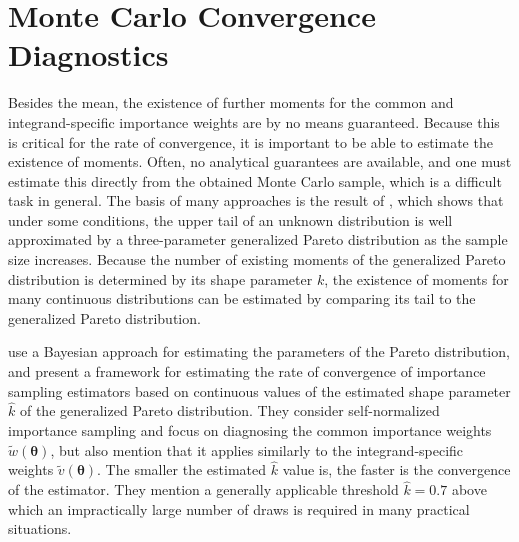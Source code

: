 \documentclass[12pt]{article}
\newcommand{\ome}{v}
\begin{document}
%
%
\section{Monte Carlo Convergence Diagnostics} \label{sec:diagnost}




Besides the mean, the existence of further moments for the
common and integrand-specific importance weights are
by no means guaranteed.
Because this is critical for the rate of convergence, it
is important to be able to estimate the existence of moments. Often, no analytical
guarantees are available, and one must estimate this directly from the obtained Monte Carlo sample, which is a difficult task in general.
The basis of many approaches is the result of
\citet{pickands1975statistical}, which shows that under some conditions, the upper tail of an unknown
distribution is well approximated by a three-parameter generalized Pareto distribution
as the sample size increases.
Because the number of existing moments
of the generalized Pareto distribution is determined by its shape parameter $k$, the existence of moments for many continuous distributions can be estimated by comparing its tail to the generalized Pareto distribution.
%
%
%
%




%
%
%
\citet{vehtari2015pareto} use a Bayesian approach
for estimating the parameters of the Pareto distribution, and
present a framework for estimating the rate of convergence of importance sampling estimators
based on continuous values of
the estimated shape parameter $\hat{k}$ of the generalized Pareto distribution.
%
%
%
%
They consider self-normalized importance sampling and focus on
diagnosing the common importance weights
$\widetilde{w} (\boldsymbol{\theta})$, but also mention that
it applies similarly to the integrand-specific weights
$\widetilde{\ome} (\boldsymbol{\theta})$.
The smaller the estimated $\hat{k}$ value is, the faster is the convergence
of the estimator.
They mention a generally applicable threshold $\hat{k} = 0.7$ above which
an impractically large number of draws is required in many
practical situations.
\end{document}
